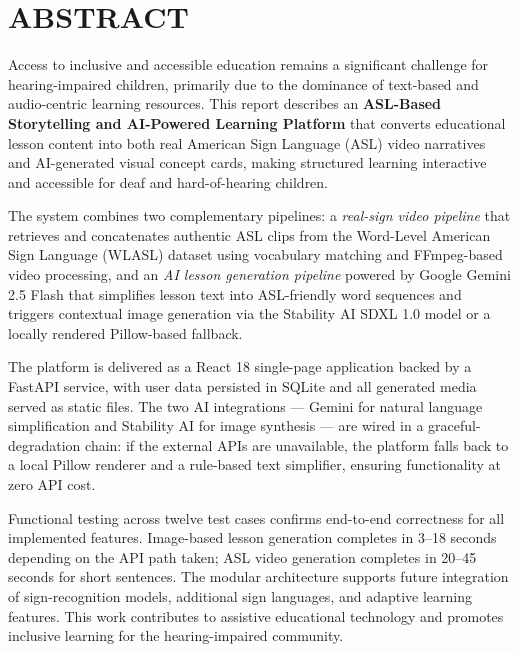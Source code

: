 \documentclass[12pt,a4paper,oneside]{report}
\begin{document}
\chapter*{ABSTRACT}

Access to inclusive and accessible education remains a significant challenge for hearing-impaired children, primarily due to the dominance of text-based and audio-centric learning resources. This report describes an \textbf{ASL-Based Storytelling and AI-Powered Learning Platform} that converts educational lesson content into both real American Sign Language (ASL) video narratives and AI-generated visual concept cards, making structured learning interactive and accessible for deaf and hard-of-hearing children.

The system combines two complementary pipelines: a \textit{real-sign video pipeline} that retrieves and concatenates authentic ASL clips from the Word-Level American Sign Language (WLASL) dataset using vocabulary matching and FFmpeg-based video processing, and an \textit{AI lesson generation pipeline} powered by Google Gemini 2.5 Flash that simplifies lesson text into ASL-friendly word sequences and triggers contextual image generation via the Stability AI SDXL 1.0 model or a locally rendered Pillow-based fallback.

The platform is delivered as a React 18 single-page application backed by a FastAPI service, with user data persisted in SQLite and all generated media served as static files. The two AI integrations --- Gemini for natural language simplification and Stability AI for image synthesis --- are wired in a graceful-degradation chain: if the external APIs are unavailable, the platform falls back to a local Pillow renderer and a rule-based text simplifier, ensuring functionality at zero API cost.

Functional testing across twelve test cases confirms end-to-end correctness for all implemented features. Image-based lesson generation completes in 3--18 seconds depending on the API path taken; ASL video generation completes in 20--45 seconds for short sentences. The modular architecture supports future integration of sign-recognition models, additional sign languages, and adaptive learning features. This work contributes to assistive educational technology and promotes inclusive learning for the hearing-impaired community.
\end{document}
